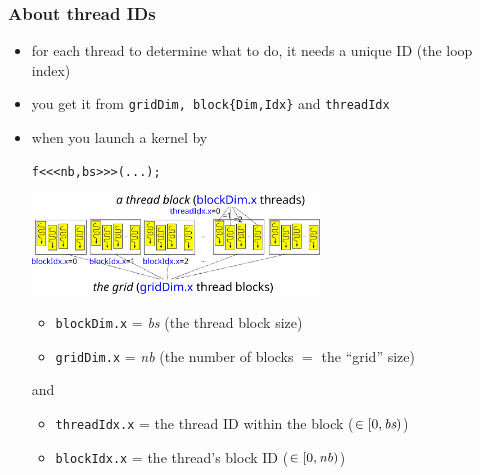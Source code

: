 \documentclass[12pt,dvipdfmx]{beamer}
\newcommand{\ao}[1]{{\color{blue}#1}}
\begin{document}
  
\begin{frame}[fragile]
\frametitle{About thread IDs}
\begin{itemize}
\item for each thread to determine what to do, it
  needs a unique ID (the loop index)
\item you get it from \ao{\tt gridDim, block\{Dim,Idx\}} and \ao{\tt threadIdx}
\item when you launch a kernel by
\begin{lstlisting}
f<<<nb,bs>>>(...);
\end{lstlisting}

\begin{center}
  \includegraphics[width=0.6\textwidth]{out/pdf/svg/thread_blocks_2.pdf}
\end{center}

\begin{itemize}
\item {\tt block\ao{Dim}.x} = {\it bs} (the thread block size)
\item {\tt grid\ao{Dim}.x} = {\it nb} (the number of blocks $=$ the ``grid'' size)
\end{itemize}
and
\begin{itemize}
\item {\tt thread\ao{Idx}.x} = the thread ID within the block
  ($\in [0, \mbox{\it bs})$)
\item {\tt block\ao{Idx}.x} = the thread's block ID
  ($\in [0, \mbox{\it nb})$)
\end{itemize}
\end{itemize}
\end{frame}
\end{document}
